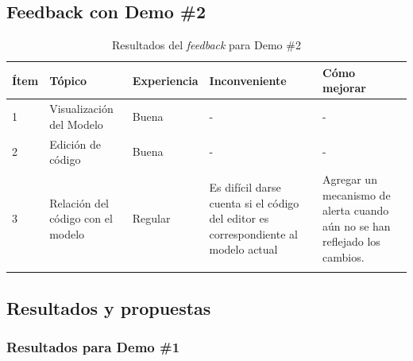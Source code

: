 \subsection{Feedback con Demo \#2}

\begin{longtable}{ |p{0.8cm}|p{2.3cm}|p{2.2cm}|p{3.6cm}|p{3.6cm}| }
\hline
     Ítem & Tópico & Experiencia  & Inconveniente & Cómo mejorar\\
\hline
1 & Visualización del Modelo & Buena & - & -\\
\hline
2 & Edición de código & Buena & - & - \\
\hline
3 & Relación del código con el modelo & Regular & Es difícil darse cuenta si el código del editor es correspondiente al modelo actual & Agregar un mecanismo de alerta cuando aún no se han reflejado los cambios.\\
\hline

\caption{\footnotesize{Resultados del \textit{feedback} para Demo \#2}}

\end{longtable}

\subsection{Resultados y propuestas}

\subsubsection{Resultados para Demo \#1}


